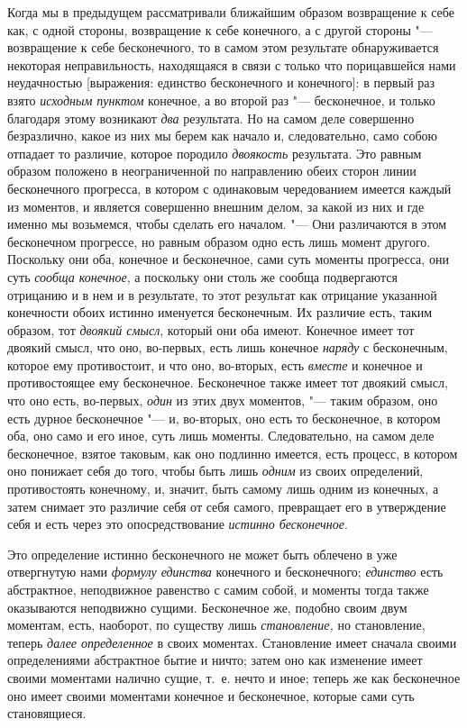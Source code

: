 Когда мы в предыдущем рассматривали ближайшим образом возвращение к себе
как, с одной стороны, возвращение к себе конечного, а с другой стороны
"--- возвращение к себе бесконечного, то в самом этом результате
обнаруживается некоторая неправильность, находящаяся в связи с только что
порицавшейся нами неудачностью [выражения: единство бесконечного и
конечного]: в первый раз взято {\em исходным пунктом}
конечное, а во второй раз "--- бесконечное, и только благодаря этому возникают
{\em два} результата. Но на самом деле совершенно
безразлично, какое из них мы берем как начало и, следовательно, само собою
отпадает то различие, которое породило {\em двоякость}
результата. Это равным образом положено в неограниченной по направлению
обеих сторон линии бесконечного прогресса, в котором с одинаковым
чередованием имеется каждый из моментов, и является совершенно внешним
делом, за какой из них и где именно мы возьмемся, чтобы сделать его
началом. "--- Они различаются в этом бесконечном прогрессе, но равным образом
одно есть лишь момент другого. Поскольку они оба, конечное и бесконечное,
сами суть моменты прогресса, они суть {\em сообща
конечное}, а поскольку они столь же сообща подвергаются отрицанию и в нем и
в результате, то этот результат как отрицание указанной конечности обоих
истинно именуется бесконечным. Их различие есть, таким образом, тот
{\em двоякий смысл}, который они оба имеют. Конечное
имеет тот двоякий смысл, что оно, во-первых, есть лишь конечное
{\em наряду} с бесконечным, которое ему противостоит, и
что оно, во-вторых, есть {\em вместе} и конечное и
противостоящее ему бесконечное. Бесконечное также имеет тот двоякий смысл,
что оно есть, во-первых, {\em один} из этих двух
моментов, "--- таким образом, оно есть дурное бесконечное "--- и, во-вторых, оно
есть то бесконечное, в котором оба, оно само и его иное, суть лишь
моменты. Следовательно, на самом деле бесконечное, взятое таковым, как оно
подлинно имеется, есть процесс, в котором оно понижает себя до того, чтобы
быть лишь {\em одним} из своих определений,
противостоять конечному, и, значит, быть самому лишь одним из конечных, а
затем снимает это различие себя от себя самого, превращает его в
утверждение себя и есть через это опосредствование
{\em истинно бесконечное}.

Это определение истинно бесконечного не может быть облечено в уже
отвергнутую нами {\em формулу единства} конечного и
бесконечного; {\em единство} есть абстрактное,
неподвижное равенство с самим собой, и моменты тогда также оказываются неподвижно
сущими. Бесконечное же, подобно своим двум моментам, есть, наоборот, по
существу лишь {\em становление,} но становление, теперь
{\em далее определенное} в своих моментах. Становление
имеет сначала своими определениями абстрактное бытие и ничто; затем оно как
изменение имеет своими моментами налично сущие, т.~е. нечто и иное;
теперь же как бесконечное оно имеет своими моментами конечное и
бесконечное, которые сами суть становящиеся.

